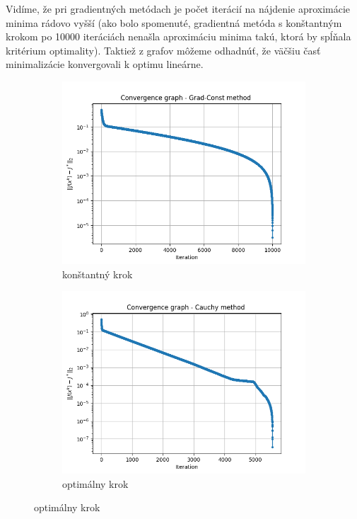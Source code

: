 \documentclass[report.tex]{subfiles}
\begin{document}
Vidíme, že pri gradientných metódach je počet iterácií na nájdenie aproximácie minima rádovo vyšší (ako bolo spomenuté, gradientná metóda s konštantným krokom po 10000 iteráciách nenašla aproximáciu minima takú, ktorá by spĺňala kritérium optimality). Taktiež z grafov môžeme odhadnúť, že väčšiu časť minimalizácie konvergovali k optimu lineárne.

\begin{figure}[h!]
	\centering
	\begin{subfigure}[b]{0.4\linewidth}
		\includegraphics[width=\linewidth]{../../source/solvency_log_reg_results/Grad-Const.png}
		\caption{konštantný krok}
	\end{subfigure}
	\begin{subfigure}[b]{0.4\linewidth}
		\includegraphics[width=\linewidth]{../../source/solvency_log_reg_results/Cauchy.png}
		\caption{optimálny krok}
	\end{subfigure}
	\label{fig:gradient}
\end{figure}
\end{document}
